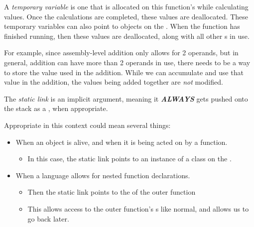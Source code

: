 \begin{definition}\label{def:Temporary_Variable}
  A \emph{temporary variable} is one that is allocated on this function's  while calculating values.
  Once the calculations are completed, these values are deallocated.
  These temporary variables can also point to objects on the .
  When the function has finished running, then these values are deallocated, along with all other s in use.
  
  For example, since assembly-level addition only allows for 2 operands, but in general, addition can have more than 2 operands in use, there needs to be a way to store the value used in the addition.
  While we can accumulate and use that value in the addition, the values being added together are \emph{not} modified.
\end{definition}

\begin{definition}\label{def:Static_Link}
  The \emph{static link} is an implicit argument, meaning it \textbf{\emph{ALWAYS}} gets pushed onto the stack as a , when appropriate.
  
  Appropriate in this context could mean several things:
  \begin{itemize}[noitemsep]
  \item When an object is alive, and when it is being acted on by a function.
    \begin{itemize}[noitemsep]
    \item In this case, the static link points to an instance of a class on the .
    \end{itemize}
  \item When a language allows for nested function declarations.
    \begin{itemize}[noitemsep]
    \item Then the static link points to the  of the outer function
    \item This allows access to the outer function's s like normal, and allows us to go back later.
    \end{itemize}
  \end{itemize}
\end{definition}

